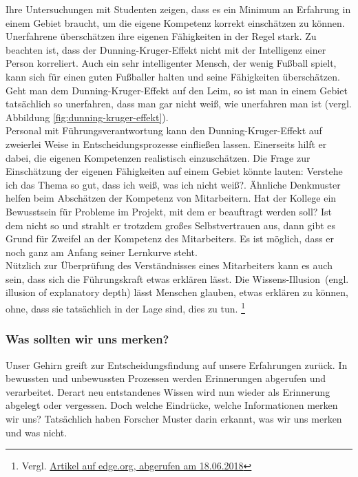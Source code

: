 Ihre Untersuchungen mit Studenten zeigen, dass es ein Minimum an Erfahrung in einem Gebiet braucht, um die eigene Kompetenz korrekt einschätzen zu können. Unerfahrene überschätzen ihre eigenen Fähigkeiten in der Regel stark. Zu beachten ist, dass der Dunning-Kruger-Effekt nicht mit der Intelligenz einer Person korreliert. Auch ein sehr intelligenter Mensch, der wenig Fußball spielt, kann sich für einen guten Fußballer halten und seine Fähigkeiten überschätzen. Geht man dem Dunning-Kruger-Effekt auf den Leim, so ist man in einem Gebiet tatsächlich so unerfahren, dass man gar nicht weiß, wie unerfahren man ist (vergl. Abbildung \ref{fig:dunning-kruger-effekt}). \\

Personal mit Führungsverantwortung kann den Dunning-Kruger-Effekt auf zweierlei Weise in Entscheidungsprozesse einfließen lassen. Einerseits hilft er dabei, die eigenen Kompetenzen realistisch einzuschätzen. Die Frage zur Einschätzung der eigenen Fähigkeiten auf einem Gebiet könnte lauten: \glqq Verstehe ich das Thema so gut, dass ich weiß, was ich nicht weiß?\grqq. Ähnliche Denkmuster helfen beim Abschätzen der Kompetenz von Mitarbeitern. Hat der Kollege ein Bewusstsein für Probleme im Projekt, mit dem er beauftragt werden soll? Ist dem nicht so und strahlt er trotzdem großes Selbstvertrauen aus, dann gibt es Grund für Zweifel an der Kompetenz des Mitarbeiters. Es ist möglich, dass er noch ganz am Anfang seiner Lernkurve steht. \\

Nützlich zur Überprüfung des Verständnisses eines Mitarbeiters kann es auch sein, dass sich die Führungskraft etwas erklären lässt. Die \glqq Wissens-Illusion\grqq~(engl. \glqq illusion of explanatory depth\grqq) lässt Menschen glauben, etwas erklären zu können, ohne, dass sie tatsächlich in der Lage sind, dies zu tun. \footnote{Vergl. \href{https://www.edge.org/response-detail/27117}{Artikel auf edge.org, abgerufen am 18.06.2018}}

\subsubsection{Was sollten wir uns merken?}
Unser Gehirn greift zur Entscheidungsfindung auf unsere Erfahrungen zurück. In bewussten und unbewussten Prozessen werden Erinnerungen abgerufen und verarbeitet. Derart neu entstandenes Wissen wird nun wieder als Erinnerung abgelegt oder vergessen. Doch welche Eindrücke, welche Informationen merken wir uns? Tatsächlich haben Forscher Muster darin erkannt, was wir uns merken und was nicht.


